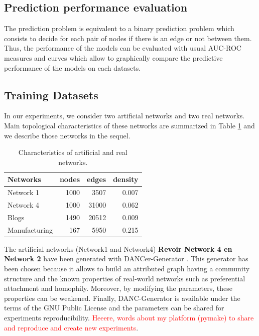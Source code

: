 \subsection{Prediction performance evaluation}
The prediction problem is equivalent to a binary prediction problem which consists to decide for each pair of nodes if there is an edge or not between them. 
Thus, the performance of the models can be evaluated with usual AUC-ROC measures and curves which allow to graphically compare the predictive performance of the models on each datasets.

\subsection{Training Datasets}

In our experiments, we consider two artificial networks and two real networks.  Main topological characteristics of these networks are summarized in Table \ref{table:networks_measures} and we describe those networks in the sequel.

\begin{table}[h] 
	\centering
	\caption{Characteristics of artificial and real networks.}
    \begin{tabular}{lrrr}
        \hline
        \textbf{Networks} &   nodes &   edges &   density \\
        \hline
        Network 1 &    1000 &    3507 &     0.007 \\
        Network 4 &    1000 &   31000 &     0.062 \\
        Blogs         &    1490 &   20512 &     0.009 \\
        Manufacturing &     167 &    5950 &     0.215 \\
    \hline
    \end{tabular}
	\label{table:networks_measures}
\end{table}

The artificial networks (Network1 and Network4) \textbf{Revoir Network 4 en Network 2} have been generated with DANCer-Generator \cite{largeron2015}. This generator has been chosen because it allows to build an attributed graph having a community structure  and  the known properties of real-world networks such as preferential attachment and homophily.
Moreover, by modifying the parameters, these properties can be weakened. Finally, DANC-Generator is available under the terms of the GNU Public License and the parameters can be shared for experiments reproducibility. \textcolor{red}{Heeere, words about my platform (pymake) to share and reproduce and create new experiments}.

